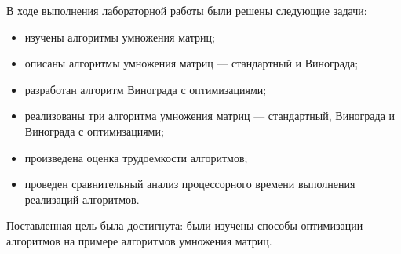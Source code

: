 \vspace{\baselineskip}

В ходе выполнения лабораторной работы были решены следующие задачи:

\begin{itemize}[label=---]
	\item изучены алгоритмы умножения матриц;
	\item описаны алгоритмы умножения матриц --- стандартный и Винограда;
	\item разработан алгоритм Винограда с оптимизациями;
	\item реализованы три алгоритма умножения матриц --- стандартный, Винограда и Винограда с оптимизациями;
	\item произведена оценка трудоемкости алгоритмов;
	\item проведен сравнительный анализ процессорного времени выполнения реализаций алгоритмов.
\end{itemize}

Поставленная цель была достигнута: были изучены способы оптимизации алгоритмов на примере алгоритмов умножения матриц.